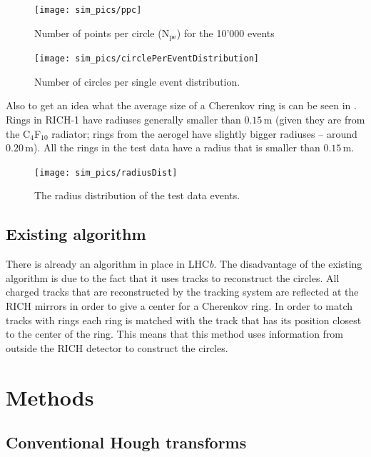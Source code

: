 \documentclass[11pt,twoside]{scrreprt}
\begin{document}
\begin{figure}[tb]
  \centering
  \texttt{[image: sim\_pics/ppc]}
  \caption{Number of points per circle (N$_\text{pe}$) for the 10'000 events}
  \label{fig:ppc1}
\end{figure}

\begin{figure}[tb]
  \centering
  \texttt{[image: sim\_pics/circlePerEventDistribution]}
  \caption{Number of circles per single event distribution.}
  \label{fig:circlePerEventDist}
\end{figure}

Also to get an idea what the average size of a Cherenkov ring is can be seen in
\cite{Forty1999}. Rings in RICH-1 have radiuses generally smaller than $0.15$\,m
(given they are from the C$_4$F$_{10}$ radiator; rings from the aerogel have
slightly bigger radiuses -- around $0.20$\,m). All the rings in the test data 
have a radius that is smaller than $0.15$\,m.

\begin{figure}[tb]
  \centering
  \texttt{[image: sim\_pics/radiusDist]}
  \caption{The radius distribution of the test data events.}
  \label{fig:radius_dist}
\end{figure}

\section{Existing algorithm} %
\label{sub:existing_algorithm}
There is already an algorithm in place in LHC\textit{b}. The disadvantage of the existing algorithm is due to the fact that it
uses tracks to reconstruct the circles. All charged tracks that are reconstructed by the tracking system are reflected at
the RICH mirrors in order to give a center for a Cherenkov ring. In order to match tracks with rings each ring is matched
with the track that has its position closest to the center of the ring. This means that this method uses information from
outside the RICH detector to construct the circles.


\chapter{Methods}

\section{Conventional Hough transforms} %
\label{sec:conventional_hough_transforms}
\end{document}
